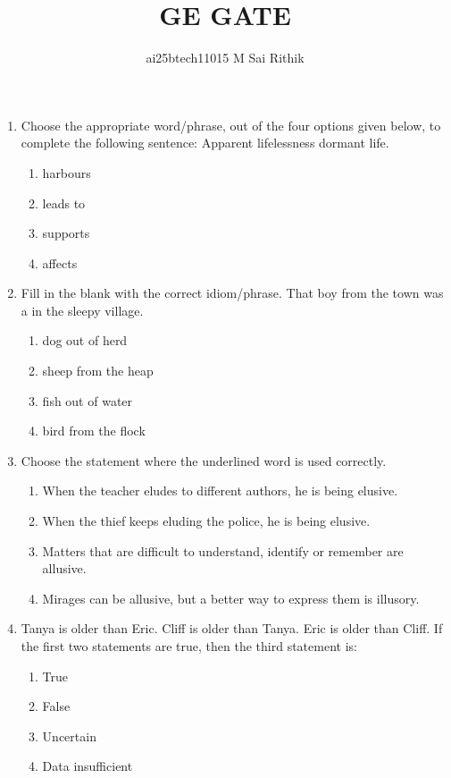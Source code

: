\documentclass[journal,12pt,onecolumn]{IEEEtran}
\theoremstyle{remark}
\begin{document}
\title{GE GATE}
\author{ai25btech11015 M Sai Rithik}
\maketitle

\begin{enumerate}
\item Choose the appropriate word/phrase, out of the four options given below, to complete the following sentence:  
Apparent lifelessness \underline{\hspace{1cm}} dormant life.  
\begin{multicols}{4}
\begin{enumerate}
\item harbours  
\item leads to  
\item supports  
\item affects  
\end{enumerate}
\end{multicols}

\item Fill in the blank with the correct idiom/phrase.  
That boy from the town was a \underline{\hspace{1cm}} in the sleepy village.  
\begin{multicols}{2}
\begin{enumerate}
\item dog out of herd  
\item sheep from the heap  
\item fish out of water  
\item bird from the flock  
\end{enumerate}
\end{multicols}

\item Choose the statement where the underlined word is used correctly.  
\begin{enumerate}
\item When the teacher eludes to different authors, he is being elusive.  
\item When the thief keeps eluding the police, he is being elusive.  
\item Matters that are difficult to understand, identify or remember are allusive.  
\item Mirages can be allusive, but a better way to express them is illusory.  
\end{enumerate}

\item Tanya is older than Eric. Cliff is older than Tanya. Eric is older than Cliff.  
If the first two statements are true, then the third statement is:  
\begin{enumerate}
\item True  
\item False  
\item Uncertain  
\item Data insufficient  
\end{enumerate}


\end{enumerate}
\end{document}
